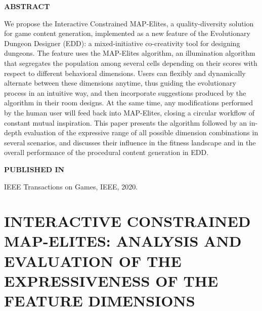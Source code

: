 \graphicspath{{included-papers-tex/paper-6/}}



\normalfont
\textbf{\textsc{ABSTRACT}}

We propose the Interactive Constrained MAP-Elites, a quality-diversity solution for game content generation, implemented as a new feature of the Evolutionary Dungeon Designer (EDD): a mixed-initiative co-creativity tool for designing dungeons. The feature uses the MAP-Elites algorithm, an illumination algorithm that segregates the population among several cells depending on their scores with respect to different behavioral dimensions. Users can flexibly and dynamically alternate between these dimensions anytime, thus guiding the evolutionary process in an intuitive way, and then incorporate suggestions produced by the algorithm in their room designs. At the same time, any modifications performed by the human user will feed back into MAP-Elites, closing a circular workflow of constant mutual inspiration. This paper presents the algorithm followed by an in-depth %
evaluation of the expressive range of all possible dimension combinations in several scenarios, %
and discusses their influence in the fitness landscape and in the overall performance of the %
procedural content generation in EDD.

\textbf{\textsc{PUBLISHED IN}}

IEEE Transactions on Games, IEEE, 2020.

\section*{INTERACTIVE CONSTRAINED \\ MAP-ELITES: ANALYSIS AND EVALUATION OF THE EXPRESSIVENESS OF THE FEATURE DIMENSIONS}




% 

% 



